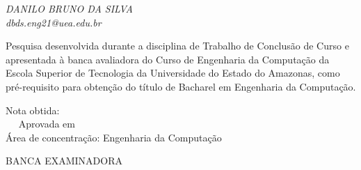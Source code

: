 \documentclass[12pt, a4paper]{article}
\numberwithin{equation}{section}
\newcommand{\bigsize}{\fontsize{12pt}{20pt}\selectfont}
\begin{document}
\newpage
\thispagestyle{empty}
\begin{center}
\textit{ {\bigsize DANILO BRUNO DA SILVA} \\[50pt] }
\textit{ {\bigsize dbds.eng21@uea.edu.br}  \\[50pt] }
\end{center}
\hspace*{8cm}
\begin{flushright}
\begin{minipage}{8cm}
\begin{singlespace}
Pesquisa desenvolvida durante a disciplina de Trabalho de Conclusão de Curso e apresentada à banca avaliadora do Curso de Engenharia da Computação da Escola Superior de Tecnologia da Universidade do Estado do Amazonas, como pré-requisito para obtenção do título de Bacharel em Engenharia da Computação.\\[30pt]
\end{singlespace}
\end{minipage}
\end{flushright}
\begin{center}
Nota obtida: {\hspace{0.5cm}\hspace{0.5cm}}
\newline \\  
Aprovada em 
\newline\\
Área de concentração: Engenharia da Computação \,\,\,\,\,\,\,\,\,\,\,\,\,\,\,
\end{center}
\vspace{1.2cm}
\begin{center}
BANCA EXAMINADORA
\end{center}
\vspace{1.0cm}  
\end{document}
